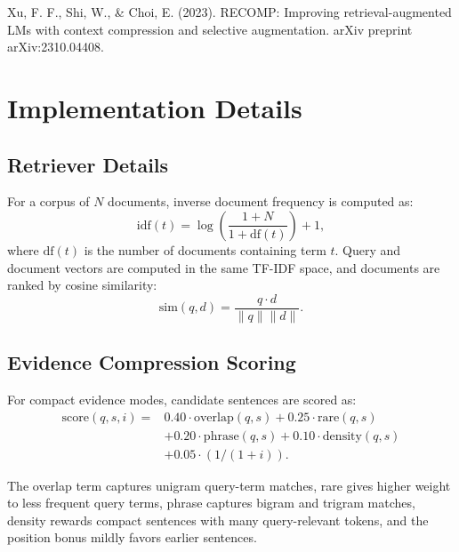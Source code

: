 \documentclass[11pt]{article}
\begin{document}
Xu, F. F., Shi, W., \& Choi, E. (2023). RECOMP: Improving retrieval-augmented LMs with context compression and selective augmentation. arXiv preprint arXiv:2310.04408.

\appendix
\onecolumn

\section{Implementation Details}

\subsection{Retriever Details}
\label{app:retriever-details}

For a corpus of $N$ documents, inverse document frequency is computed as:
\begin{equation}
\mathrm{idf}(t) = \log\left(\frac{1 + N}{1 + \mathrm{df}(t)}\right) + 1,
\end{equation}
where $\mathrm{df}(t)$ is the number of documents containing term $t$. Query and document vectors are computed in the same TF-IDF space, and documents are ranked by cosine similarity:
\begin{equation}
\mathrm{sim}(q,d) = \frac{q \cdot d}{\lVert q \rVert \lVert d \rVert}.
\end{equation}

\subsection{Evidence Compression Scoring}
\label{app:evidence-scoring}

For compact evidence modes, candidate sentences are scored as:
\begin{equation}
\begin{split}
\mathrm{score}(q,s,i) ={}& 0.40 \cdot \mathrm{overlap}(q,s)
+ 0.25 \cdot \mathrm{rare}(q,s) \\
&+ 0.20 \cdot \mathrm{phrase}(q,s)
+ 0.10 \cdot \mathrm{density}(q,s) \\
&+ 0.05 \cdot (1 / (1 + i)).
\end{split}
\end{equation}

The overlap term captures unigram query-term matches, rare gives higher weight to less frequent query terms, phrase captures bigram and trigram matches, density rewards compact sentences with many query-relevant tokens, and the position bonus mildly favors earlier sentences.
\end{document}

